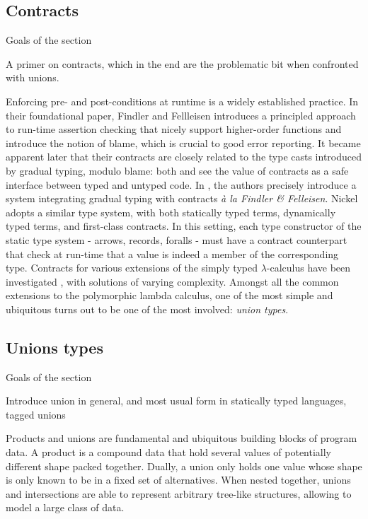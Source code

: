 \documentclass{article}
\begin{document}
\subsection{Contracts}
\color{red}Goals of the section

A primer on contracts, which in the end are the problematic bit when confronted
with unions.\vspace{0.5cm}

\color{black}

Enforcing pre- and post-conditions at runtime is a widely established practice.
In their foundational paper\cite{FindlerFelleisenHOContracts}, Findler and
Fellleisen introduces a principled approach to run-time assertion checking that
nicely support higher-order functions and introduce the notion of blame, which
is crucial to good error reporting. It became apparent later that their
contracts are closely related to the type casts introduced by gradual typing,
modulo blame: both \cite{FindlerMultiLang} and \cite{FelleisenInterLang} see the
value of contracts as a safe interface between typed and untyped code. In
\cite{WellTypedBlamed}, the authors precisely introduce a system integrating
gradual typing with contracts \textit{à la Findler \& Felleisen}. Nickel adopts
a similar type system, with both statically typed terms, dynamically typed
terms, and first-class contracts.  In this setting, each type constructor of the
static type system - arrows, records, foralls - must have a contract counterpart
that check at run-time that a value is indeed a member of the corresponding
type. Contracts for various extensions of the simply typed $\lambda$-calculus
have been investigated \cite{BlameForAll, KeilThiemannUnionIntersection,
RootCauseOfBlame, DependentContracts, GradualTypingClasses}, with solutions of
varying complexity.  Amongst all the common extensions to the polymorphic lambda
calculus, one of the most simple and ubiquitous turns out to be one of the most
involved: \emph{union types}.

\subsection{Unions types}
\color{red}Goals of the section

Introduce union in general, and most usual form in statically typed languages, tagged unions\vspace{0.5cm}\color{black}

Products and unions are fundamental and ubiquitous building blocks of program
data. A product is a compound data that hold several values of potentially
different shape packed together. Dually, a union only holds one value whose
shape is only known to be in a fixed set of alternatives. When nested together,
unions and intersections are able to represent arbitrary tree-like structures,
allowing to model a large class of data.
\end{document}
